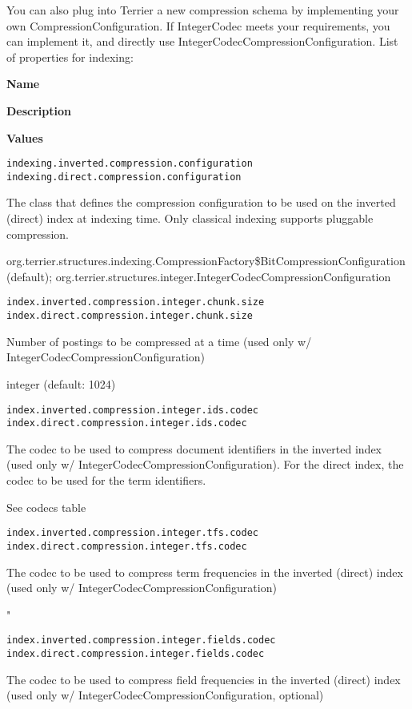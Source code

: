 You can also plug into Terrier a new compression schema by implementing
your own CompressionConfiguration. If IntegerCodec meets your
requirements, you can implement it, and directly use
IntegerCodecCompressionConfiguration. List of properties for indexing:

\textbf{Name}

\textbf{Description}

\textbf{Values}

\texttt{indexing.inverted.compression.configuration}\\
\texttt{indexing.direct.compression.configuration}

The class that defines the compression configuration to be used on the
inverted (direct) index at indexing time. Only classical indexing
supports pluggable compression.

org.terrier.structures.indexing.CompressionFactory\$BitCompressionConfiguration
(default);
org.terrier.structures.integer.IntegerCodecCompressionConfiguration

\texttt{index.inverted.compression.integer.chunk.size}\\
\texttt{index.direct.compression.integer.chunk.size}

Number of postings to be compressed at a time (used only w/
IntegerCodecCompressionConfiguration)

integer (default: 1024)

\texttt{index.inverted.compression.integer.ids.codec}\\
\texttt{index.direct.compression.integer.ids.codec}

The codec to be used to compress document identifiers in the inverted
index (used only w/ IntegerCodecCompressionConfiguration). For the
direct index, the codec to be used for the term identifiers.

See codecs table

\texttt{index.inverted.compression.integer.tfs.codec}\\
\texttt{index.direct.compression.integer.tfs.codec}

The codec to be used to compress term frequencies in the inverted
(direct) index (used only w/ IntegerCodecCompressionConfiguration)

"

\texttt{index.inverted.compression.integer.fields.codec}\\
\texttt{index.direct.compression.integer.fields.codec}

The codec to be used to compress field frequencies in the inverted
(direct) index (used only w/ IntegerCodecCompressionConfiguration,
optional)

